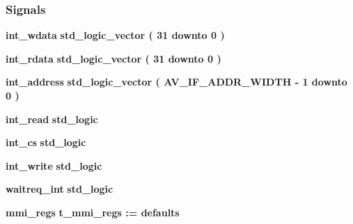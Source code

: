\subsubsection*{Signals}
 \begin{DoxyCompactItemize}
\item 
{\bf int\+\_\+wdata} {\bfseries \textcolor{comment}{std\+\_\+logic\+\_\+vector}\textcolor{vhdlchar}{ }\textcolor{vhdlchar}{(}\textcolor{vhdlchar}{ }\textcolor{vhdlchar}{ } \textcolor{vhdldigit}{31} \textcolor{vhdlchar}{ }\textcolor{keywordflow}{downto}\textcolor{vhdlchar}{ }\textcolor{vhdlchar}{ } \textcolor{vhdldigit}{0} \textcolor{vhdlchar}{ }\textcolor{vhdlchar}{)}\textcolor{vhdlchar}{ }} 
\item 
{\bf int\+\_\+rdata} {\bfseries \textcolor{comment}{std\+\_\+logic\+\_\+vector}\textcolor{vhdlchar}{ }\textcolor{vhdlchar}{(}\textcolor{vhdlchar}{ }\textcolor{vhdlchar}{ } \textcolor{vhdldigit}{31} \textcolor{vhdlchar}{ }\textcolor{keywordflow}{downto}\textcolor{vhdlchar}{ }\textcolor{vhdlchar}{ } \textcolor{vhdldigit}{0} \textcolor{vhdlchar}{ }\textcolor{vhdlchar}{)}\textcolor{vhdlchar}{ }} 
\item 
{\bf int\+\_\+address} {\bfseries \textcolor{comment}{std\+\_\+logic\+\_\+vector}\textcolor{vhdlchar}{ }\textcolor{vhdlchar}{(}\textcolor{vhdlchar}{ }\textcolor{vhdlchar}{ }\textcolor{vhdlchar}{ }\textcolor{vhdlchar}{ }{\bfseries {\bf A\+V\+\_\+\+I\+F\+\_\+\+A\+D\+D\+R\+\_\+\+W\+I\+D\+TH}} \textcolor{vhdlchar}{-\/}\textcolor{vhdlchar}{ } \textcolor{vhdldigit}{1} \textcolor{vhdlchar}{ }\textcolor{keywordflow}{downto}\textcolor{vhdlchar}{ }\textcolor{vhdlchar}{ } \textcolor{vhdldigit}{0} \textcolor{vhdlchar}{ }\textcolor{vhdlchar}{)}\textcolor{vhdlchar}{ }} 
\item 
{\bf int\+\_\+read} {\bfseries \textcolor{comment}{std\+\_\+logic}\textcolor{vhdlchar}{ }} 
\item 
{\bf int\+\_\+cs} {\bfseries \textcolor{comment}{std\+\_\+logic}\textcolor{vhdlchar}{ }} 
\item 
{\bf int\+\_\+write} {\bfseries \textcolor{comment}{std\+\_\+logic}\textcolor{vhdlchar}{ }} 
\item 
{\bf waitreq\+\_\+int} {\bfseries \textcolor{comment}{std\+\_\+logic}\textcolor{vhdlchar}{ }} 
\item 
{\bf mmi\+\_\+regs} {\bfseries \textcolor{vhdlchar}{t\+\_\+mmi\+\_\+regs}\textcolor{vhdlchar}{ }\textcolor{vhdlchar}{ }\textcolor{vhdlchar}{\+:}\textcolor{vhdlchar}{=}\textcolor{vhdlchar}{ }\textcolor{vhdlchar}{ }\textcolor{vhdlchar}{ }\textcolor{vhdlchar}{ }\textcolor{vhdlchar}{defaults}\textcolor{vhdlchar}{ }} 

\end{DoxyCompactItemize}
